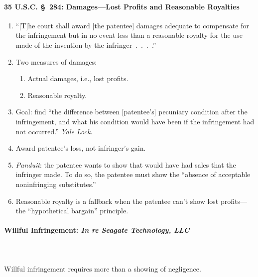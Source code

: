 \paragraph{35 U.S.C. \S\ 284: Damages---Lost Profits and Reasonable Royalties}

\begin{enumerate}
    \item ``[T]he court shall award [the patentee] damages adequate to 
    compensate for the infringement but in no event less than a reasonable 
    royalty for the use made of the invention by the infringer~.~.~.~.''
    \item Two measures of damages:
    \begin{enumerate}
        \item Actual damages, i.e., lost profits.
        \item Reasonable royalty.
    \end{enumerate}
    \item Goal: find ``the difference between [patentee's] pecuniary condition 
    after the infringement, and what his condition would have been if the 
    infringement had not occurred.'' \emph{Yale Lock}.
    \item Award patentee's loss, not infringer's gain.
    \item \emph{Panduit}: the patentee wants to show that would have had sales 
    that the infringer made. To do so, the patentee must show the ``absence of 
    acceptable noninfringing substitutes.''
    \item Reasonable royalty is a fallback when the patentee can't show lost 
    profits---the ``hypothetical bargain'' principle.
\end{enumerate}

\paragraph{Willful Infringement: \emph{In re Seagate Technology, LLC}}
~\\\\
Willful infringement requires more than a showing of negligence.

